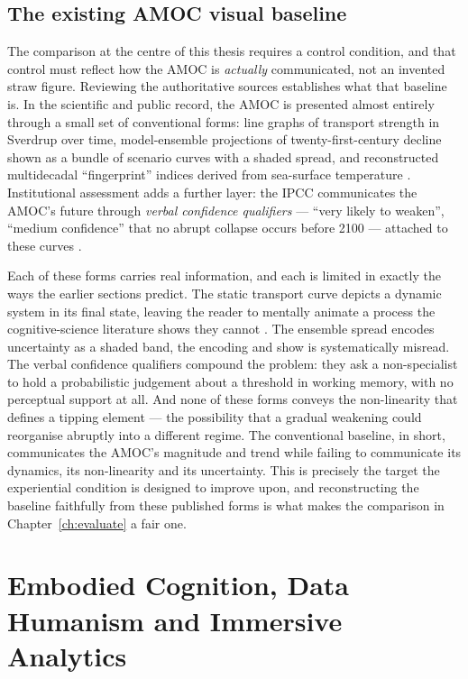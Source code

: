 \subsection{The existing AMOC visual baseline}
\label{subsec:amoc-baseline}

The comparison at the centre of this thesis requires a control condition, and that control must reflect how the AMOC is \emph{actually} communicated, not an invented straw figure. Reviewing the authoritative sources establishes what that baseline is. In the scientific and public record, the AMOC is presented almost entirely through a small set of conventional forms: line graphs of transport strength in Sverdrup over time, model-ensemble projections of twenty-first-century decline shown as a bundle of scenario curves with a shaded spread, and reconstructed multidecadal ``fingerprint'' indices derived from sea-surface temperature \citep{caesar2018, ipcc2021}. Institutional assessment adds a further layer: the IPCC communicates the AMOC's future through \emph{verbal confidence qualifiers} --- ``very likely to weaken'', ``medium confidence'' that no abrupt collapse occurs before 2100 --- attached to these curves \citep{ipcc2021}.

Each of these forms carries real information, and each is limited in exactly the ways the earlier sections predict. The static transport curve depicts a dynamic system in its final state, leaving the reader to mentally animate a process the cognitive-science literature shows they cannot \citep{sterman2008, cronin2009}. The ensemble spread encodes uncertainty as a shaded band, the encoding \citet{mcmahon2015} and \citet{padilla2018} show is systematically misread. The verbal confidence qualifiers compound the problem: they ask a non-specialist to hold a probabilistic judgement about a threshold in working memory, with no perceptual support at all. And none of these forms conveys the non-linearity that defines a tipping element --- the possibility that a gradual weakening could reorganise abruptly into a different regime. The conventional baseline, in short, communicates the AMOC's magnitude and trend while failing to communicate its dynamics, its non-linearity and its uncertainty. This is precisely the target the experiential condition is designed to improve upon, and reconstructing the baseline faithfully from these published forms is what makes the comparison in Chapter~\ref{ch:evaluate} a fair one.

\section{Embodied Cognition, Data Humanism and Immersive Analytics}
\label{sec:embodied-viz}

